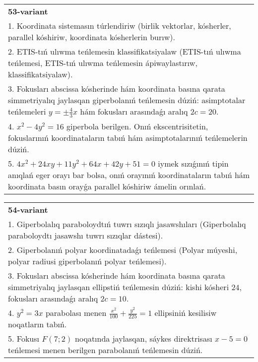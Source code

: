 \documentclass{article}
\begin{document}
\begin{tabular}{m{17cm}}
\textbf{53-variant}\\
1. Koordinata sistemasın túrlendiriw (birlik vektorlar, kósherler, parallel kóshiriw, koordinata kósherlerin burıw).\\

2. ETIS-tıń ulıwma teńlemesin klassifikatsiyalaw (ETIS-tıń ulıwma teńlemesi, ETIS-tıń ulıwma teńlemesin ápiwaylastırıw, klassifikatsiyalaw).\\

3. Fokusları abscissa kósherinde hám koordinata basına qarata simmetriyalıq jaylasqan giperbolanıń teńlemesin dúziń: asimptotalar teńlemeleri $y=\pm \frac{4}{3}x$ hám fokusları arasındaǵı aralıq $2 c=20$.\\

4. $x^{2} - 4y^{2} = 16$ giperbola berilgen. Onıń ekscentrisitetin, fokuslarınıń koordinataların tabıń hám asimptotalarınıń teńlemelerin dúziń.\\

5. $4x^{2} + 24xy + 11y^{2} + 64x + 42y + 51 = 0$ iymek sızıǵınıń tipin anıqlań eger orayı bar bolsa, onıń orayınıń koordinataların tabıń hám koordinata basın orayǵa parallel kóshiriw ámelin orınlań.  
\end{tabular}
\vspace{1cm}


\begin{tabular}{m{17cm}}
\textbf{54-variant}\\
1. Giperbolalıq paraboloydtıń tuwrı sızıqlı jasawshıları (Giperbolalıq paraboloydtı jasawshı tuwrı sızıqlar dástesi).\\

2. Giperbolanıń polyar koordinatadaǵı teńlemesi (Polyar múyeshi, polyar radiusi giperbolanıń polyar teńlemesi).\\

3. Fokusları abscissa kósherinde hám koordinata basına qarata simmetriyalıq jaylasqan ellipstiń teńlemesin dúziń: kishi kósheri $24$, fokusları arasındaǵı aralıq $2 c=10$.\\

4. $y^{2} = 3x$ parabolası menen $\frac{x^{2}}{100} + \frac{y^{2}}{225} = 1$ ellipsiniń kesilisiw noqatların tabıń.  \\

5. Fokusı $F(7;2)$ noqatında jaylasqan, sáykes direktrisası $x - 5 = 0$ teńlemesi menen berilgen parabolanıń teńlemesin dúziń.  
\end{tabular}
\vspace{1cm}
\end{document}

